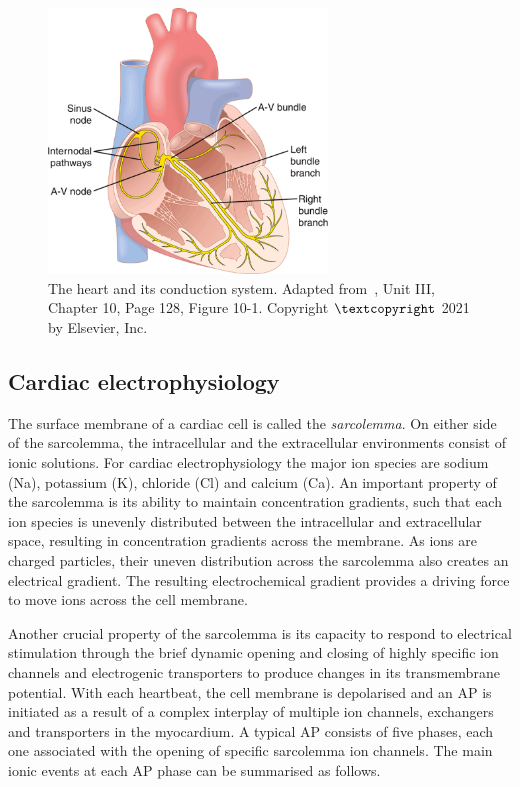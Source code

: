 \begin{figure}[!ht]
    \myfloatalign
    \includegraphics[width=0.66\textwidth]{figures/chapter01/fig_elsv_8.png}
    \caption{The heart and its conduction system. Adapted from~\cite{Guyton:2021}, Unit III, Chapter 10, Page 128, Figure 10-1. Copyright $\textcopyright$ 2021 by Elsevier, Inc.}
    \label{fig:heartcondactionsystem}
\end{figure}


%
%
%
\subsection{Cardiac electrophysiology}\label{sec:ch1cardiac_electrophysiology}
The surface membrane of a cardiac cell is called the \textit{sarcolemma}. On either side of the sarcolemma, the intracellular and the extracellular environments consist of ionic solutions. For cardiac electrophysiology the major ion species are sodium (\acs{Na}), potassium (\acs{K}), chloride (\acs{Cl}) and calcium (\acs{Ca}). An important property of the sarcolemma is its ability to maintain concentration gradients, such that each ion species is unevenly distributed between the intracellular and extracellular space, resulting in concentration gradients across the membrane. As ions are charged particles, their uneven distribution across the sarcolemma also creates an electrical gradient. The resulting electrochemical gradient provides a driving force to move ions across the cell membrane.


\vspace{0.2cm}
Another crucial property of the sarcolemma is its capacity to respond to electrical stimulation through the brief dynamic opening and closing of highly specific ion channels and electrogenic transporters to produce changes in its transmembrane potential. With each heartbeat, the cell membrane is depolarised and an AP is initiated as a result of a complex interplay of multiple ion channels, exchangers and transporters in the myocardium. A typical AP consists of five phases, each one associated with the opening of specific sarcolemma ion channels. The main ionic events at each AP phase can be summarised as follows.

